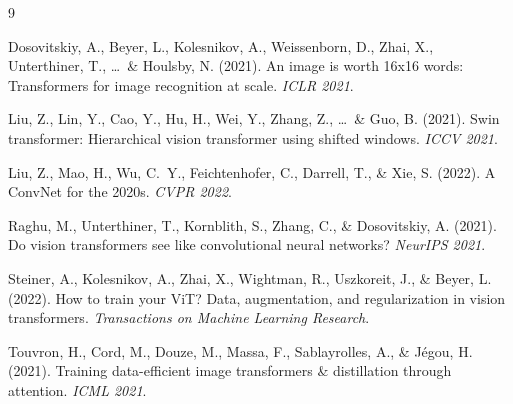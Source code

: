 \documentclass{article}
\begin{document}


{\small

\begin{thebibliography}{9}

Dosovitskiy, A., Beyer, L., Kolesnikov, A., Weissenborn, D., Zhai, X., Unterthiner, T., \ldots\ \& Houlsby, N. (2021).
\newblock An image is worth 16x16 words: Transformers for image recognition at scale.
\newblock \textit{ICLR 2021}.

Liu, Z., Lin, Y., Cao, Y., Hu, H., Wei, Y., Zhang, Z., \ldots\ \& Guo, B. (2021).
\newblock Swin transformer: Hierarchical vision transformer using shifted windows.
\newblock \textit{ICCV 2021}.

Liu, Z., Mao, H., Wu, C.~Y., Feichtenhofer, C., Darrell, T., \& Xie, S. (2022).
\newblock A ConvNet for the 2020s.
\newblock \textit{CVPR 2022}.

Raghu, M., Unterthiner, T., Kornblith, S., Zhang, C., \& Dosovitskiy, A. (2021).
\newblock Do vision transformers see like convolutional neural networks?
\newblock \textit{NeurIPS 2021}.

Steiner, A., Kolesnikov, A., Zhai, X., Wightman, R., Uszkoreit, J., \& Beyer, L. (2022).
\newblock How to train your ViT? Data, augmentation, and regularization in vision transformers.
\newblock \textit{Transactions on Machine Learning Research}.

Touvron, H., Cord, M., Douze, M., Massa, F., Sablayrolles, A., \& J\'egou, H. (2021).
\newblock Training data-efficient image transformers \& distillation through attention.
\newblock \textit{ICML 2021}.

\end{thebibliography}
}





\end{document}
